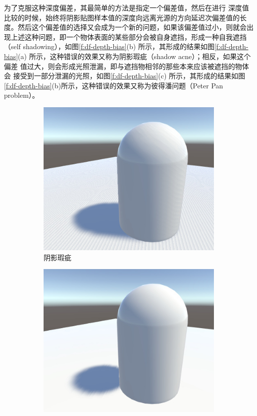 为了克服这种深度偏差，其最简单的方法是指定一个偏差值，然后在进行 深度值比较的时候，始终将阴影贴图样本值的深度向远离光源的方向延迟次偏差值的长度。然后这个偏差值的选择又会成为一个新的问题，如果该偏差值过小，则就会出现上述这种问题，即一个物体表面的某些部分会被自身遮挡，形成一种自我遮挡（self shadowing），如图\ref{f:df-depth-bias}(b) 所示，其形成的结果如图\ref{f:df-depth-bias}(a) 所示，这种错误的效果又称为阴影瑕疵（shadow acne）；相反，如果这个偏差 值过大，则会形成光照泄漏，即与遮挡物相邻的那些本来应该被遮挡的物体会 接受到一部分泄漏的光照，如图\ref{f:df-depth-bias}(c) 所示，其形成的结果如图\ref{f:df-depth-bias}(b)所示，这种错误的效果又称为彼得潘问题（Peter Pan problem）。

\begin{figure}
	\begin{subfigure}[b]{0.5\textwidth}
		\includegraphics[width=\textwidth]{figures/shadows/ShadowBiasAcne}
		\caption{阴影瑕疵}
	\end{subfigure}
	\begin{subfigure}[b]{0.5\textwidth}
		\includegraphics[width=\textwidth]{figures/shadows/ShadowBiasPeterPanning}

\end{subfigure}
\end{figure}
